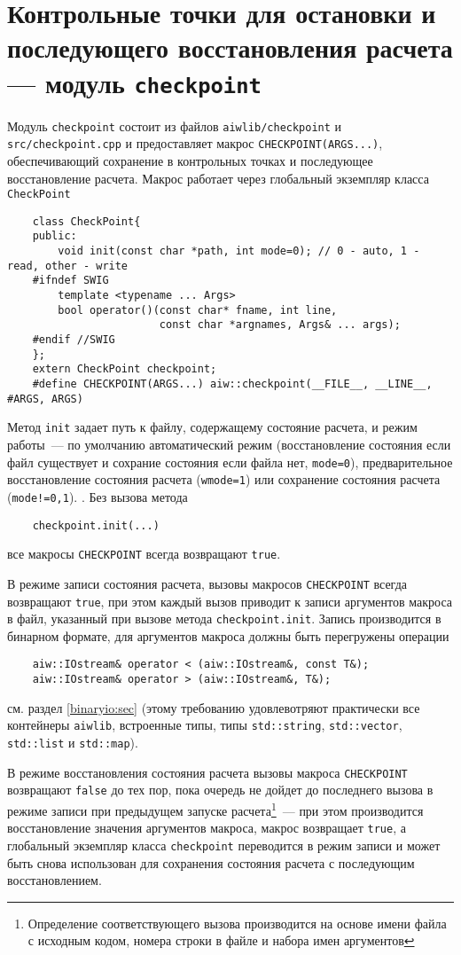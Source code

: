 \section{Контрольные точки для остановки и последующего восстановления расчета --- модуль {\tt checkpoint}}
Модуль \verb'checkpoint' состоит из файлов \verb'aiwlib/checkpoint' и \verb'src/checkpoint.cpp' и
предоставляет макрос \verb'CHECKPOINT(ARGS...)', обеспечивающий сохранение в контрольных точках и последующее восстановление расчета.
Макрос работает через глобальный экземпляр класса \verb'CheckPoint'
\begin{verbatim}
    class CheckPoint{
    public:
        void init(const char *path, int mode=0); // 0 - auto, 1 - read, other - write
    #ifndef SWIG
        template <typename ... Args> 
        bool operator()(const char* fname, int line,
                        const char *argnames, Args& ... args);
    #endif //SWIG
    };
    extern CheckPoint checkpoint;
    #define CHECKPOINT(ARGS...) aiw::checkpoint(__FILE__, __LINE__, #ARGS, ARGS)
\end{verbatim}
Метод \verb'init' задает путь к файлу, содержащему состояние расчета, и режим работы~--- по умолчанию автоматический режим
(восстановление состояния если файл существует и сохрание состояния если файла нет,
\verb'mode=0'), предварительное восстановление состояния расчета (\verb'wmode=1') или
сохранение состояния расчета (\verb'mode!=0,1').
.
Без вызова метода
\begin{verbatim}
    checkpoint.init(...)
\end{verbatim}
все макросы \verb'CHECKPOINT' всегда возвращают \verb'true'.

В режиме записи состояния расчета, вызовы макросов \verb'CHECKPOINT' всегда возвращают \verb'true',
при этом каждый вызов приводит к записи аргументов макроса в файл, указанный при вызове метода \verb'checkpoint.init'.
Запись производится в бинарном формате, для аргументов макроса должны быть перегружены операции
\begin{verbatim}
    aiw::IOstream& operator < (aiw::IOstream&, const T&);
    aiw::IOstream& operator > (aiw::IOstream&, T&);
\end{verbatim}
см. раздел \ref{binaryio:sec} (этому требованию удовлевотряют практически все контейнеры \verb'aiwlib', встроенные типы, типы \verb'std::string',
\verb'std::vector', \verb'std::list' и \verb'std::map').

В режиме восстановления состояния расчета вызовы макроса \verb'CHECKPOINT' возвращают \verb'false' до тех пор, пока очередь не дойдет до последнего вызова
в режиме записи при предыдущем запуске расчета\footnote{Определение соответствующего вызова производится на основе  имени файла с исходным кодом,
  номера строки в файле и набора имен аргументов}~--- при этом производится восстановление значения аргументов макроса, макрос возвращает \verb'true',
а глобальный экземпляр класса \verb'checkpoint' переводится в режим записи и может быть снова использован для сохранения состояния расчета с последующим восстановлением.

